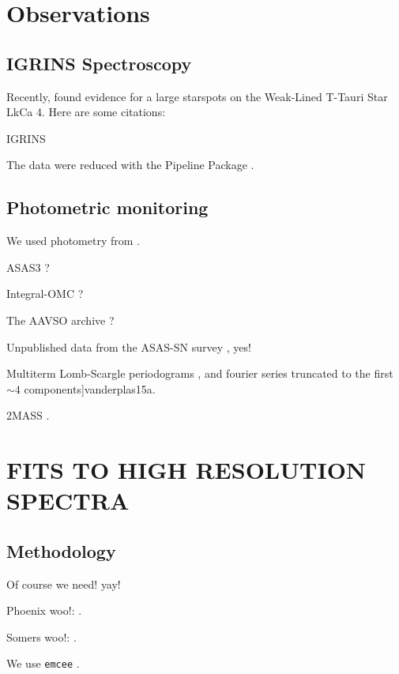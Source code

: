 \documentclass[twocolumn]{emulateapj}%
\newcommand{\iancze}{{\sc C15}}
\begin{document}
\section{Observations}\label{sec:obs}




\subsection{IGRINS Spectroscopy}\label{sec:igrins}

Recently, \citet{2017ApJ...836..200G} found evidence for a large starspots on the Weak-Lined T-Tauri Star LkCa 4.
Here are some citations:

IGRINS \citep{park14}

The data were reduced with the Pipeline Package \citep{jaejoonlee15}.

\subsection{Photometric monitoring}

We used photometry from \citep{grankin08}.


ASAS3 \citep{pojmanski04}?

Integral-OMC \citep{garzon12}?

The AAVSO archive \citep{kafka16}?

Unpublished data from the ASAS-SN survey \citep{shappee14}, yes!


Multiterm Lomb-Scargle periodograms \citep{ivezic14}, and fourier series truncated to the first $\sim 4$ components]{vanderplas15a}.

2MASS \citep{skrutskie06}.

\section{FITS TO HIGH RESOLUTION SPECTRA}\label{sec:Starfish}


\subsection{Methodology}\label{sec:methods}

Of course we need! \citet[hereafter \iancze]{czekala15}
yay!

Phoenix woo!: \citep{husser13}.

Somers woo!: \citep{somers15}.

We use \texttt{emcee} \citep{foreman13}.
\end{document}
